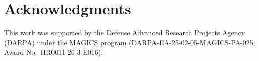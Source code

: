 \documentclass[technote,10pt]{IEEEtran}
\begin{document}
\section*{Acknowledgments}
This work was supported by the Defense Advanced Research Projects Agency (DARPA) under the MAGICS program (DARPA-EA-25-02-05-MAGICS-PA-025; Award No.~HR0011-26-3-E016).




\end{document}
